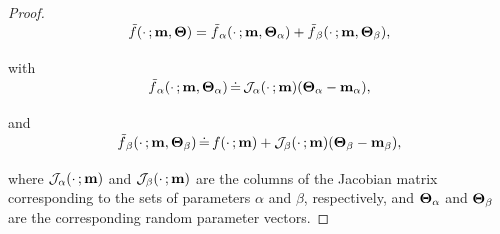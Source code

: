 \begin{appendices}
\begin{proof}
\begin{align}
\SwapAboveDisplaySkip
\label{app-eq:linearization_decomposition}
    \flin(\cdot \,; \mathbf{m}, \bTheta)
    =
    \flin_{\alpha}(\cdot \,; \mathbf{m}, \bTheta_{\alpha}) + \flin_{\beta}(\cdot \,; \mathbf{m}, \bTheta_{\beta}) ,
\end{align}
with
\begin{align}
\SwapAboveDisplaySkip
    \flin_{\alpha}(\cdot \,; \mathbf{m}, \bTheta_{\alpha})
    \defines
    \jac_{\alpha}(\cdot \,; \mathbf{m})(\bTheta_{\alpha} - \mathbf{m}_{\alpha}) ,
\end{align}
and
\begin{align}
\SwapAboveDisplaySkip
    \flin_{\beta}(\cdot \,; \mathbf{m}, \bTheta_{\beta})
    \defines
    f(\cdot \,; \mathbf{m}) + \jac_{\beta}(\cdot \,; \mathbf{m})(\bTheta_{\beta} - \mathbf{m}_{\beta}) ,
\end{align}
where $\mathcal{J}_{\alpha}(\cdot \,; \mathbf{m})$ and $\mathcal{J}_{\beta}(\cdot \,; \mathbf{m})$ are the columns of the Jacobian matrix corresponding to the sets of parameters $\alpha$ and $\beta$, respectively, and $\boldsymbol{\Theta}_{\alpha}$ and $\boldsymbol{\Theta}_{\beta}$ are the corresponding random parameter vectors.


\end{proof}
\end{appendices}
